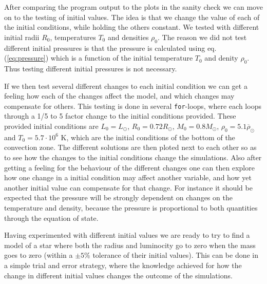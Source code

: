 \documentclass{emulateapj}
\begin{document}
	After comparing the program output to the plots in the sanity check we can move on to the testing of initial values. The idea is that we change the value of each of the initial conditions, while holding the others constant. We tested with different initial radii $R_0$, temperatures $T_0$ and densities $\rho_0$. The reason we did not test different initial pressures is that the pressure is calculated using eq. (\ref{eq:pressure}) which is a function of the initial temperature $T_0$ and denity $\rho_0$. Thus testing different initial pressures is not necessary. 
	
	If we then test several different changes to each initial condition we can get a feeling how each of the changes affect the model, and which changes may compensate for others. This testing is done in several \texttt{for}-loops, where each loops through a 1/5 to 5 factor change to the initial conditions provided. These provided initial conditions are $L_0=L_\odot$, $R_0=0.72R_\odot$, $M_0 = 0.8M_\odot$, $\rho_0 = 5.1\overline{\rho}_\odot$ and $T_0 = 5.7\cdot10^{6}$ K, which are the initial conditions of the bottom of the convection zone. The different solutions are then ploted next to each other so as to see how the changes to the initial conditions change the simulations. Also after getting a feeling for the behaviour of the different changes one can then explore how one change in a initial condition may affect another variable, and how yet another initial value can compensate for that change. For instance it should be expected that the pressure will be strongly dependent on changes on the temperature and density, because the pressure is proportional to both quantities through the equation of state.  
	
	Having experimented with different initial values we are ready to try to find a model of a star where both the radius and luminocity go to zero when the mass goes to zero (within a $\pm5$\% tolerance of their initial values). This can be done in a simple trial and error strategy, where the knowledge achieved for how the change in different initial values changes the outcome of the simulations. 
	
\end{document}

